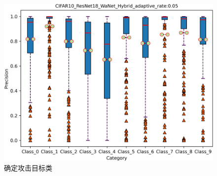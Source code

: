 \documentclass[fontset=macnew,UTF8]{article} %
\begin{document}
\begin{figure}[h!]
{\begin{minipage}[b]{.3\linewidth}
			\includegraphics[scale=0.28]{./Backdoor_detect_result/target_class/WaNet.png}
		\end{minipage}
	}
	\caption{确定攻击目标类}
	\label{target_class}
\end{figure}
\end{document}
